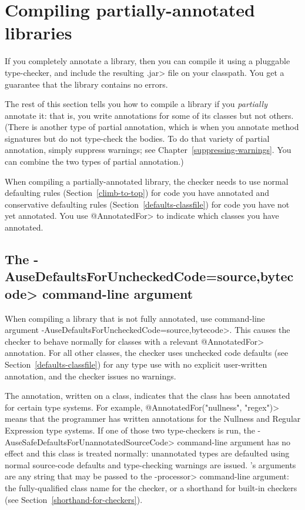 \section{Compiling partially-annotated libraries\label{compiling-libraries}}

If you completely annotate a library, then you can compile it using a
pluggable type-checker, and include the resulting \<.jar> file on your
classpath.  You get a guarantee that the library contains no errors.

The rest of this section tells you how to compile a library if you
\emph{partially} annotate it:  that is, you write annotations for some of its
classes but not others.
(There is another type of partial annotation, which is when you annotate
method signatures but do not type-check the bodies.  To do that variety of
partial annotation, simply suppress warnings; see
Chapter~\ref{suppressing-warnings}.  You can combine the two types of
partial annotation.)

When compiling a partially-annotated library, the checker needs to use normal
defaulting rules (Section~\ref{climb-to-top}) for code you have annotated and
conservative defaulting rules (Section~\ref{defaults-classfile}) for
code you have not yet annotated.
You use \<@AnnotatedFor> to indicate which classes you have annotated.



\subsection{The \<-AuseDefaultsForUncheckedCode=source,bytecode> command-line
argument\label{AuseDefaultsForUncheckedCodesource}}

\begin{sloppypar}
When compiling a library that is not fully annotated, use command-line
argument \<-AuseDefaultsForUncheckedCode=source,bytecode>.  This causes
the checker to behave normally for classes with a relevant \<@AnnotatedFor>
annotation.  For all other classes, the checker uses unchecked code defaults
(see Section~\ref{defaults-classfile}) for any type use with no explicit
user-written annotation, and the checker issues no warnings.
\end{sloppypar}

The  annotation, written on a
class, indicates that the class has been annotated for certain type
systems.  For example, \<@AnnotatedFor(\ttlcb"nullness", "regex"\ttrcb)> means that
the programmer has written annotations for the Nullness and Regular
Expression type systems.  If one of those two type-checkers is run,
the \<-AuseSafeDefaultsForUnannotatedSourceCode> command-line argument
has no effect and this class is treated normally:
unannotated types are defaulted using normal source-code
defaults and type-checking warnings are issued.
's arguments are any string that
may be passed to the \<-processor> command-line argument:  the
fully-qualified class name for the checker, or a shorthand for built-in
checkers (see Section~\ref{shorthand-for-checkers}).

